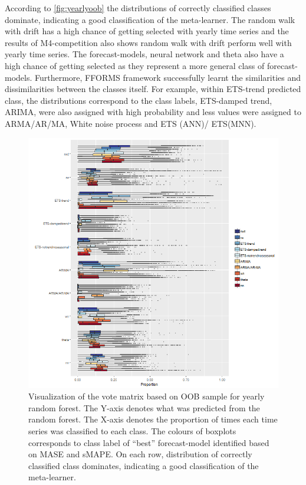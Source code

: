 \documentclass[11pt,a4paper,]{article}
\begin{document}
According to \autoref{fig:yearlyoob} the distributions of correctly
classified classes dominate, indicating a good classification of the
meta-learner. The random walk with drift has a high chance of getting
selected with yearly time series and the results of M4-competition also
shows random walk with drift perform well with yearly time series. The
forecast-models, neural network and theta also have a high chance of
getting selected as they represent a more general class of
forecast-models. Furthermore, FFORMS framework successfully learnt the
similarities and dissimilarities between the classes itself. For
example, within ETS-trend predicted class, the distributions correspond
to the class labels, ETS-damped trend, ARIMA, were also assigned with
high probability and less values were assigned to ARMA/AR/MA, White
noise process and ETS (ANN)/ ETS(MNN).

\begin{figure}
\centering
\includegraphics{figures/yearlyoob-1.png}
\caption{\label{fig:yearlyoob}Visualization of the vote matrix based on OOB
sample for yearly random forest. The Y-axis denotes what was predicted
from the random forest. The X-axis denotes the proportion of times each
time series was classified to each class. The colours of boxplots
corresponds to class label of ``best'' forecast-model identified based
on MASE and sMAPE. On each row, distribution of correctly classified
class dominates, indicating a good classification of the meta-learner.}
\end{figure}
\end{document}
